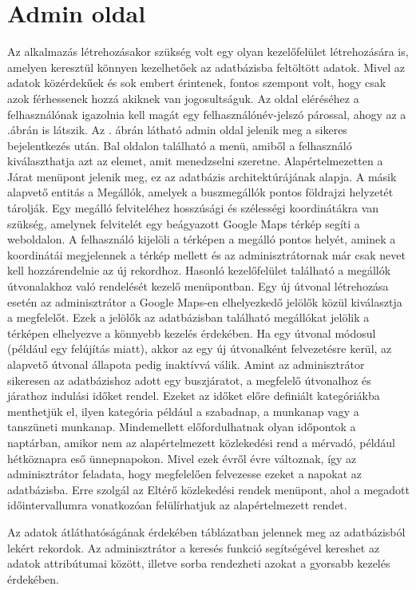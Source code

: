 \section{Admin oldal}
\label{admin}
Az alkalmazás létrehozásakor szükség volt egy olyan kezelőfelület létrehozására is, amelyen keresztül könnyen kezelhetőek az adatbázisba feltöltött adatok.
Mivel az adatok közérdekűek és sok embert érintenek, fontos szempont volt, hogy csak azok férhessenek hozzá akiknek van jogosultságuk.
Az oldal eléréséhez a felhasználónak igazolnia kell magát egy felhasználónév-jelszó párossal, ahogy az a .ábrán is látszik.
Az . ábrán látható admin oldal jelenik meg a sikeres bejelentkezés után.
Bal oldalon található a menü, amiből a felhasználó kiválaszthatja azt az elemet, amit menedzselni szeretne.
Alapértelmezetten a Járat menüpont jelenik meg, ez az adatbázis architektúrájának alapja.
A másik alapvető entitás a Megállók, amelyek a buszmegállók pontos földrajzi helyzetét tárolják.
Egy megálló felviteléhez hosszúsági és szélességi koordinátákra van szükség, amelynek felvitelét egy beágyazott Google Maps térkép segíti a weboldalon.
A felhasználó kijelöli a térképen a megálló pontos helyét, aminek a koordinátái megjelennek a térkép mellett és az adminisztrátornak már csak nevet kell hozzárendelnie az új rekordhoz.
Hasonló kezelőfelület található a megállók útvonalakhoz való rendelését kezelő menüpontban.
Egy új útvonal létrehozása esetén az adminisztrátor a Google Maps-en elhelyezkedő jelölők közül kiválasztja a megfelelőt.
Ezek a jelölők az adatbázisban található megállókat jelölik a térképen elhelyezve a könnyebb kezelés érdekében.
Ha egy útvonal módosul (például egy felújítás miatt), akkor az egy új útvonalként felvezetésre kerül, az alapvető útvonal állapota pedig inaktívvá válik.
Amint az adminisztrátor sikeresen az adatbázishoz adott egy buszjáratot, a megfelelő útvonalhoz és járathoz indulási időket rendel.
Ezeket az időket előre definiált kategóriákba menthetjük el, ilyen kategória például a szabadnap, a munkanap vagy a tanszüneti munkanap.
Mindemellett előfordulhatnak olyan időpontok a naptárban, amikor nem az alapértelmezett közlekedési rend a mérvadó, például hétköznapra eső ünnepnapokon.
Mivel ezek évről évre változnak, így az adminisztrátor feladata, hogy megfelelően felvezesse ezeket a napokat az adatbázisba.
Erre szolgál az Eltérő közlekedési rendek menüpont, ahol a megadott időintervallumra vonatkozóan felülírhatjuk az alapértelmezett rendet.

Az adatok átláthatóságának érdekében táblázatban jelennek meg az adatbázisból lekért rekordok.
Az adminisztrátor a keresés funkció segítségével kereshet az adatok attribútumai között, illetve sorba rendezheti azokat a gyorsabb kezelés érdekében.




















